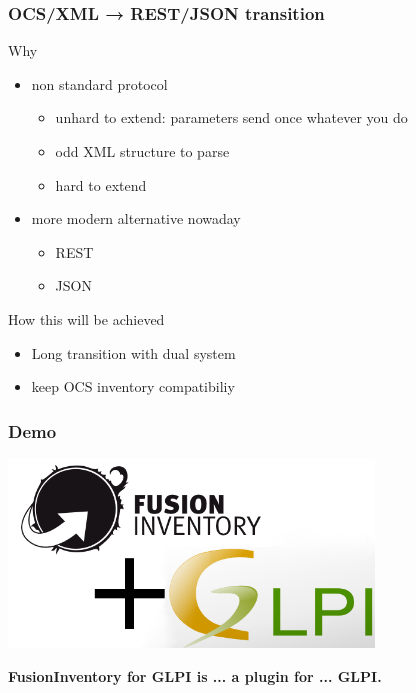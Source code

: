 \documentclass{beamer}
\begin{document}
%
\begin{frame}
\frametitle{OCS/XML → REST/JSON transition}
    
\begin{block}{Why}
    \begin{itemize}
    \item non standard protocol
    \begin{itemize}
    \item unhard to extend: parameters send once whatever you do
    \item odd XML structure to parse
    \item hard to extend
    \end{itemize}
    \item more modern alternative nowaday 
    \begin{itemize}
    \item REST
    \item JSON
    \end{itemize}
    \end{itemize}
\end{block}

 \begin{block}{How this will be achieved}
    \begin{itemize}
    \item Long transition with dual system
    \item keep OCS inventory compatibiliy
    \end{itemize}
\end{block} 

\end{frame}

\begin{frame}
    \frametitle{Demo}

   \includegraphics[height=5cm]{./pics/fusinvglpi.png}

    \bf{FusionInventory for GLPI} is ... \pause a plugin for \pause ... \bf{GLPI}.
\end{frame}
\end{document}
